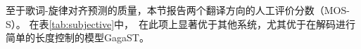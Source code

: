 至于歌词-旋律对齐预测的质量，本节报告两个翻译方向的人工评价分数（MOS-S）。
在表\ref{tab:subjective}中，\modelname~在此项上显著优于其他系统，尤其优于在解码进行简单的长度控制的模型GagaST。

